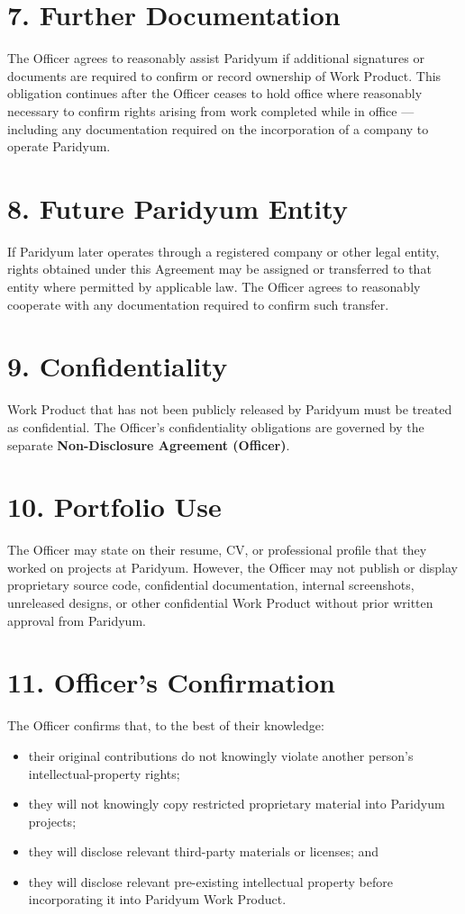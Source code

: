 \documentclass{paridyum}
\begin{document}
\section*{7. Further Documentation}
The Officer agrees to reasonably assist Paridyum if additional signatures or documents
are required to confirm or record ownership of Work Product. This obligation continues
after the Officer ceases to hold office where reasonably necessary to confirm rights
arising from work completed while in office --- including any documentation required on
the incorporation of a company to operate Paridyum.

\section*{8. Future Paridyum Entity}
If Paridyum later operates through a registered company or other legal entity, rights
obtained under this Agreement may be assigned or transferred to that entity where
permitted by applicable law. The Officer agrees to reasonably cooperate with any
documentation required to confirm such transfer.

\section*{9. Confidentiality}
Work Product that has not been publicly released by Paridyum must be treated as
confidential. The Officer's confidentiality obligations are governed by the separate
\textbf{Non-Disclosure Agreement (Officer)}.

\section*{10. Portfolio Use}
The Officer may state on their resume, CV, or professional profile that they worked on
projects at Paridyum. However, the Officer may not publish or display proprietary source
code, confidential documentation, internal screenshots, unreleased designs, or other
confidential Work Product without prior written approval from Paridyum.

\section*{11. Officer's Confirmation}
The Officer confirms that, to the best of their knowledge:
\begin{itemize}[leftmargin=*, noitemsep]
    \item their original contributions do not knowingly violate another person's
          intellectual-property rights;
    \item they will not knowingly copy restricted proprietary material into Paridyum
          projects;
    \item they will disclose relevant third-party materials or licenses; and
    \item they will disclose relevant pre-existing intellectual property before
          incorporating it into Paridyum Work Product.
\end{itemize}
\end{document}
